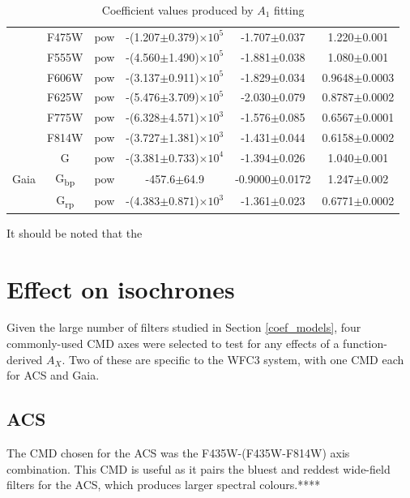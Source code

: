 \documentclass[12pt, a4paper]{report}
\begin{document}
\begin{table}
\begin{center}
\begin{tabular}{cccccc}
& F475W & pow & -(1.207$\pm$0.379)$\times 10^{5}$ & -1.707$\pm$0.037 & 1.220$\pm$0.001 \\
& F555W & pow & -(4.560$\pm$1.490)$\times 10^{5}$ & -1.881$\pm$0.038 & 1.080$\pm$0.001 \\
& F606W & pow & -(3.137$\pm$0.911)$\times 10^{5}$ & -1.829$\pm$0.034 & 0.9648$\pm$0.0003 \\
& F625W & pow & -(5.476$\pm$3.709)$\times 10^{5}$ & -2.030$\pm$0.079 & 0.8787$\pm$0.0002 \\
& F775W & pow & -(6.328$\pm$4.571)$\times 10^{3}$ & -1.576$\pm$0.085 & 0.6567$\pm$0.0001 \\
& F814W & pow & -(3.727$\pm$1.381)$\times 10^{3}$ & -1.431$\pm$0.044 & 0.6158$\pm$0.0002 \\ \hline

& G & pow & -(3.381$\pm$0.733)$\times 10^{4}$ & -1.394$\pm$0.026 & 1.040$\pm$0.001 \\
Gaia & G\textsubscript{bp} & pow & -457.6$\pm$64.9 & -0.9000$\pm$0.0172 & 1.247$\pm$0.002 \\
& G\textsubscript{rp} & pow & -(4.383$\pm$0.871)$\times 10^{3}$ & -1.361$\pm$0.023 & 0.6771$\pm$0.0002 \\ \hline

\end{tabular}
\caption{Coefficient values produced by $A_{1}$ fitting}
\label{simpfunc_coeffs_table}
\end{center}
\end{table}

It should be noted that the 

\section{Effect on isochrones}
Given the large number of filters studied in Section \ref{coef_models}, four commonly-used CMD axes were selected to test for any effects of a function-derived $A_{X}$. Two of these are specific to the WFC3 system, with one CMD each for ACS and Gaia.
\subsection{ACS} \label{ACS_isoc}

The CMD chosen for the ACS was the F435W-(F435W-F814W) axis combination. This CMD is useful as it pairs the bluest and reddest wide-field filters for the ACS, which produces larger spectral colours.****
\end{document}

